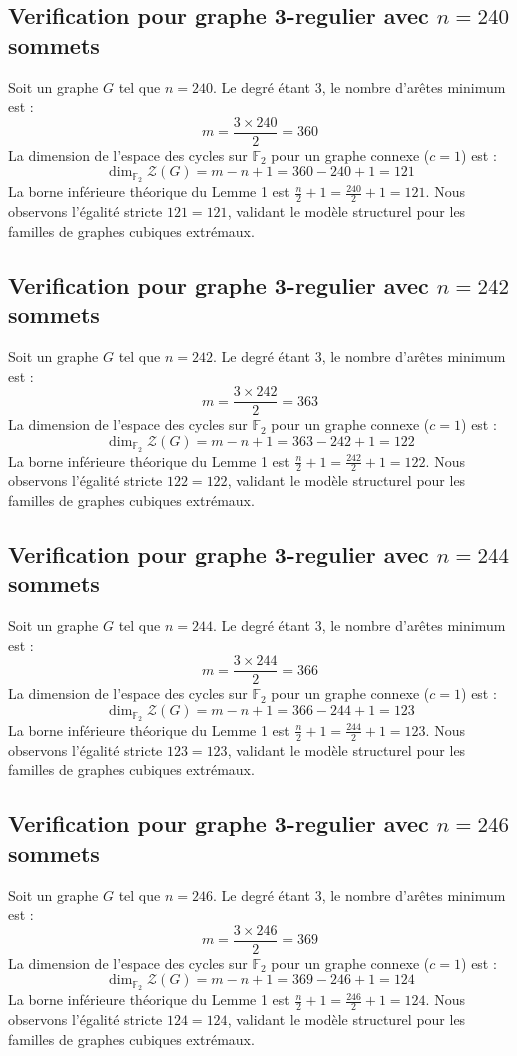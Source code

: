 \documentclass[11pt,a4paper]{article}
\begin{document}
\subsection{Verification pour graphe 3-regulier avec $n=240$ sommets}
Soit un graphe $G$ tel que $n = 240$. Le degré étant 3, le nombre d'arêtes minimum est :
$$ m = \frac{3 \times 240}{2} = 360 $$
La dimension de l'espace des cycles sur $\mathbb{F}_2$ pour un graphe connexe ($c=1$) est :
$$ \dim_{\mathbb{F}_2} \mathcal{Z}(G) = m - n + 1 = 360 - 240 + 1 = 121 $$
La borne inférieure théorique du Lemme 1 est $\frac{n}{2} + 1 = \frac{240}{2} + 1 = 121$.
Nous observons l'égalité stricte $121 = 121$, validant le modèle structurel pour les familles de graphes cubiques extrémaux.

\subsection{Verification pour graphe 3-regulier avec $n=242$ sommets}
Soit un graphe $G$ tel que $n = 242$. Le degré étant 3, le nombre d'arêtes minimum est :
$$ m = \frac{3 \times 242}{2} = 363 $$
La dimension de l'espace des cycles sur $\mathbb{F}_2$ pour un graphe connexe ($c=1$) est :
$$ \dim_{\mathbb{F}_2} \mathcal{Z}(G) = m - n + 1 = 363 - 242 + 1 = 122 $$
La borne inférieure théorique du Lemme 1 est $\frac{n}{2} + 1 = \frac{242}{2} + 1 = 122$.
Nous observons l'égalité stricte $122 = 122$, validant le modèle structurel pour les familles de graphes cubiques extrémaux.

\subsection{Verification pour graphe 3-regulier avec $n=244$ sommets}
Soit un graphe $G$ tel que $n = 244$. Le degré étant 3, le nombre d'arêtes minimum est :
$$ m = \frac{3 \times 244}{2} = 366 $$
La dimension de l'espace des cycles sur $\mathbb{F}_2$ pour un graphe connexe ($c=1$) est :
$$ \dim_{\mathbb{F}_2} \mathcal{Z}(G) = m - n + 1 = 366 - 244 + 1 = 123 $$
La borne inférieure théorique du Lemme 1 est $\frac{n}{2} + 1 = \frac{244}{2} + 1 = 123$.
Nous observons l'égalité stricte $123 = 123$, validant le modèle structurel pour les familles de graphes cubiques extrémaux.

\subsection{Verification pour graphe 3-regulier avec $n=246$ sommets}
Soit un graphe $G$ tel que $n = 246$. Le degré étant 3, le nombre d'arêtes minimum est :
$$ m = \frac{3 \times 246}{2} = 369 $$
La dimension de l'espace des cycles sur $\mathbb{F}_2$ pour un graphe connexe ($c=1$) est :
$$ \dim_{\mathbb{F}_2} \mathcal{Z}(G) = m - n + 1 = 369 - 246 + 1 = 124 $$
La borne inférieure théorique du Lemme 1 est $\frac{n}{2} + 1 = \frac{246}{2} + 1 = 124$.
Nous observons l'égalité stricte $124 = 124$, validant le modèle structurel pour les familles de graphes cubiques extrémaux.
\end{document}
